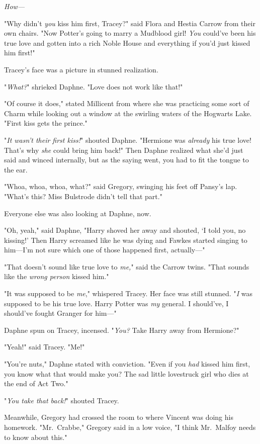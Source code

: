 \emph{How---}

"Why didn't \emph{you} kiss him first, Tracey?" said Flora and Hestia Carrow
from their own chairs. "Now Potter's going to marry a Mudblood girl! \emph{You}
could've been his true love and gotten into a rich Noble House and everything
if you'd just kissed him first!"

Tracey's face was a picture in stunned realization.

"\emph{What?}" shrieked Daphne. "Love does not work like that!"

"Of course it does," stated Millicent from where she was practicing some sort
of Charm while looking out a window at the swirling waters of the Hogwarts
Lake. "First kiss gets the prince."

"\emph{It wasn't their first kiss!}" shouted Daphne. "Hermione was
\emph{already} his true love! That's why \emph{she} could bring him back!" Then
Daphne realized what she'd just said and winced internally, but as the saying
went, you had to fit the tongue to the ear.

"Whoa, whoa, whoa, what?" said Gregory, swinging his feet off Pansy's lap.
"What's this? Miss Bulstrode didn't tell that part."

Everyone else was also looking at Daphne, now.

"Oh, yeah," said Daphne, "Harry shoved her away and shouted, `I told you, no
kissing!' Then Harry screamed like he was dying and Fawkes started singing to
him---I'm not sure which one of those happened first, actually\mbox{---}"

"That doesn't sound like true love to \emph{me,}" said the Carrow twins. "That
sounds like the \emph{wrong person} kissed him."

"It was supposed to be \emph{me}," whispered Tracey. Her face was still
stunned. "\emph{I} was supposed to be his true love. Harry Potter was \emph{my}
general. I should've, I should've fought Granger for him\mbox{---}"

Daphne spun on Tracey, incensed. "\emph{You?} Take Harry away from Hermione?"

"Yeah!" said Tracey. "Me!"

"You're nuts," Daphne stated with conviction. "Even if you \emph{had} kissed
him first, you know what that would make you? The sad little lovestruck girl
who dies at the end of Act Two."

"\emph{You take that back!}" shouted Tracey.

Meanwhile, Gregory had crossed the room to where Vincent was doing his
homework. "Mr.~Crabbe," Gregory said in a low voice, "I think Mr.~Malfoy needs
to know about this."
\sbreak
